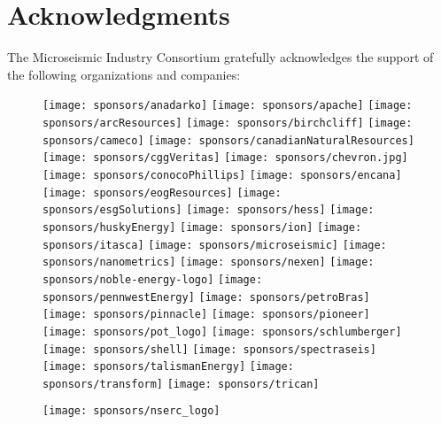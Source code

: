 \chapter*{Acknowledgments}\label{chap:ackn}
The Microseismic Industry Consortium gratefully acknowledges the support of the
following organizations and companies:
\vspace{0.5in}


\begin{figure}[htb]
  \texttt{[image: sponsors/anadarko]}
  \texttt{[image: sponsors/apache]}
  \texttt{[image: sponsors/arcResources]}
  \texttt{[image: sponsors/birchcliff]}
   \texttt{[image: sponsors/cameco]}
    \texttt{[image: sponsors/canadianNaturalResources]}
     \texttt{[image: sponsors/cggVeritas]}
     \texttt{[image: sponsors/chevron.jpg]}
      \texttt{[image: sponsors/conocoPhillips]}
       \texttt{[image: sponsors/encana]}
        \texttt{[image: sponsors/eogResources]}
         \texttt{[image: sponsors/esgSolutions]}
          \texttt{[image: sponsors/hess]}
           \texttt{[image: sponsors/huskyEnergy]}
            \texttt{[image: sponsors/ion]}
             \texttt{[image: sponsors/itasca]}
              \texttt{[image: sponsors/microseismic]}
               \texttt{[image: sponsors/nanometrics]}
                \texttt{[image: sponsors/nexen]}
                 \texttt{[image: sponsors/noble-energy-logo]}
                  \texttt{[image: sponsors/pennwestEnergy]}
                   \texttt{[image: sponsors/petroBras]}
                    \texttt{[image: sponsors/pinnacle]}
   \texttt{[image: sponsors/pioneer]}
   \texttt{[image: sponsors/pot\_logo]}
   \texttt{[image: sponsors/schlumberger]}
   \texttt{[image: sponsors/shell]}
   \texttt{[image: sponsors/spectraseis]}
   \texttt{[image: sponsors/talismanEnergy]}
   \texttt{[image: sponsors/transform]}
   \texttt{[image: sponsors/trican]}\\
   \begin{center}
   \texttt{[image: sponsors/nserc\_logo]}
   \end{center}

\end{figure}


